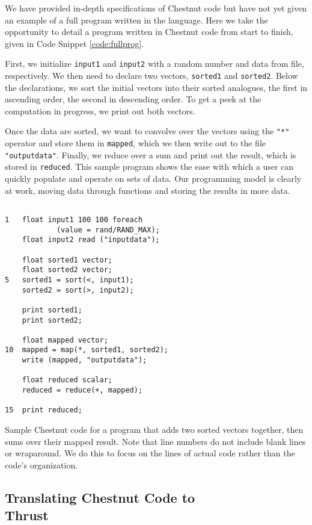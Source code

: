\documentclass[twocolumn]{article}
\renewcommand{\|}{\origbar} %
\newcommand{\code}[1]{\texttt{#1}}
\begin{document}
We have provided in-depth specifications of Chestnut code but have not yet given an example of a full program written in the language. Here we take the opportunity to detail a program written in Chestnut code from start to finish, given in Code Snippet \ref{code:fullprog}.

First, we initialize \code{input1} and \code{input2} with a random number and data from file, respectively. We then need to declare two vectors, \code{sorted1} and \code{sorted2}. Below the declarations, we sort the initial vectors into their sorted analogues, the first in ascending order, the second in descending order. To get a peek at the computation in progress, we print out both vectors.

Once the data are sorted, we want to convolve over the vectors using the \code{"*"} operator and store them in \code{mapped}, which we then write out to the file \code{"outputdata"}. Finally, we reduce over a sum and print out the result, which is stored in \code{reduced}. This sample program shows the ease with which a user can quickly populate and operate on sets of data. Our programming model is clearly at work, moving data through functions and storing the results in more data.

\begin{Code Snippet}
\begin{verbatim}

1   float input1 100 100 foreach 
            (value = rand/RAND_MAX);
    float input2 read ("inputdata");

    float sorted1 vector;
    float sorted2 vector;
5   sorted1 = sort(<, input1);
    sorted2 = sort(>, input2);

    print sorted1;
    print sorted2;

    float mapped vector;
10  mapped = map(*, sorted1, sorted2);
    write (mapped, "outputdata");
  
    float reduced scalar;
    reduced = reduce(+, mapped);

15  print reduced;
\end{verbatim}
\caption{Sample Chestnut code for a program that adds two sorted vectors together, then sums over their mapped result. Note that line numbers do not include blank lines or wraparound. We do this to focus on the lines of actual code rather than the code's organization.}
\label{code:fullprog}
\end{Code Snippet}

\if@twocolumn
\subsection{Translating Chestnut Code to \\ Thrust}
\else
\end{document}
